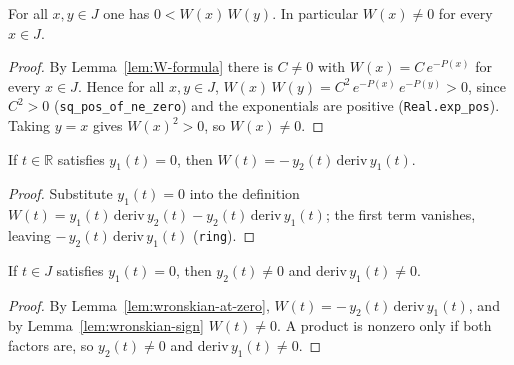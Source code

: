 \begin{lemma}
    \label{lem:wronskian-sign}
    \leanok
    For all $x, y \in J$ one has $0 < W(x)\,W(y)$. In particular
    $W(x) \ne 0$ for every $x \in J$.
\end{lemma}
\begin{proof}
    By Lemma~\ref{lem:W-formula} there is $C \ne 0$ with $W(x) = C\,e^{-P(x)}$
    for every $x \in J$. Hence for all $x, y \in J$,
    $W(x)\,W(y) = C^2\,e^{-P(x)}\,e^{-P(y)} > 0$, since $C^2 > 0$
    (\texttt{sq\_pos\_of\_ne\_zero}) and the exponentials are positive
    (\texttt{Real.exp\_pos}). Taking $y = x$ gives $W(x)^2 > 0$, so
    $W(x) \ne 0$.
\end{proof}

\begin{lemma}
    \label{lem:wronskian-at-zero}
    \leanok
    If $t \in \mathbb{R}$ satisfies $y_1(t) = 0$, then
    $W(t) = -\,y_2(t)\,\mathrm{deriv}\,y_1(t)$.
\end{lemma}
\begin{proof}
    Substitute $y_1(t) = 0$ into the definition
    $W(t) = y_1(t)\,\mathrm{deriv}\,y_2(t) - y_2(t)\,\mathrm{deriv}\,y_1(t)$;
    the first term vanishes, leaving $-\,y_2(t)\,\mathrm{deriv}\,y_1(t)$
    (\texttt{ring}).
\end{proof}

\begin{lemma}
    \label{lem:factors-nonzero-at-zero}
    \leanok
    If $t \in J$ satisfies $y_1(t) = 0$, then $y_2(t) \ne 0$ and
    $\mathrm{deriv}\,y_1(t) \ne 0$.
\end{lemma}
\begin{proof}
    By Lemma~\ref{lem:wronskian-at-zero},
    $W(t) = -\,y_2(t)\,\mathrm{deriv}\,y_1(t)$, and by
    Lemma~\ref{lem:wronskian-sign} $W(t) \ne 0$. A product is nonzero only if
    both factors are, so $y_2(t) \ne 0$ and $\mathrm{deriv}\,y_1(t) \ne 0$.
\end{proof}

